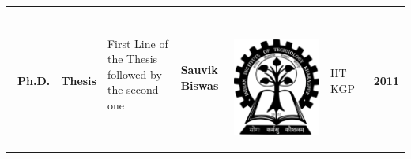 \documentclass{iitkgpthesis}
\begin{document}
\begin{landscape}
 \begin{tabular*}{5in}{p{2mm}p{4mm}|p{140mm}|p{50mm}|p{4mm}p{2mm}p{4mm}}
&&&&&&\\
\multirow{3}{*}{\begin{rotate}{90}{~}\textbf{Ph.D.}\end{rotate}} &
\multirow{3}{*}{\begin{rotate}{90}\textbf{Thesis}\end{rotate}} &
First Line of the Thesis \newline followed by the second one& 
\multirow{2}{*}{\textbf{Sauvik Biswas}}&
\multirow{3}{*}{\begin{rotate}{90}{~}\includegraphics[scale=0.05]{iitlogo.pdf}\end{rotate}} & 
\multirow{3}{*}{\begin{rotate}{90}{\scriptsize IIT KGP}\end{rotate}} & 
\multirow{3}{*}{\begin{rotate}{90}{~}\textbf{2011}\end{rotate}} \\
&&&&&&\\
&&&&&&\\
\end{tabular*}
\end{landscape}
\end{document}
